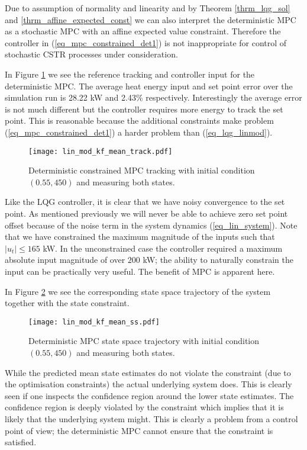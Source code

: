 Due to assumption of normality and linearity and by Theorem \ref{thrm_lqg_sol} and \ref{thrm_affine_expected_const} we can also interpret the deterministic MPC as a stochastic MPC with an affine expected value constraint. Therefore the controller in (\ref{eq_mpc_constrained_det1}) is not inappropriate for control of stochastic CSTR processes under consideration.

In Figure \ref{fig_lin_mod_kf_mean_track} we see the reference tracking and controller input for the deterministic MPC. The average heat energy input and set point error over the simulation run is 28.22 kW and 2.43\% respectively. Interestingly the average error is not much different but the controller requires more energy to track the set point. This is reasonable because the additional constraints make problem (\ref{eq_mpc_constrained_det1}) a harder problem than (\ref{eq_lqg_linmod}).
\begin{figure}[H] 
\centering
\texttt{[image: lin\_mod\_kf\_mean\_track.pdf]}
\caption{Deterministic constrained MPC tracking with initial condition $(0.55, 450)$ and measuring both states.}
\label{fig_lin_mod_kf_mean_track}
\end{figure}
Like the LQG controller, it is clear that we have noisy convergence to the set point. As mentioned previously we will never be able to achieve zero set point offset because of the noise term in the system dynamics (\ref{eq_lin_system}). Note that we have constrained the maximum magnitude of the inputs such that $|u_t| \leq 165$ kW. In the unconstrained case the controller required a maximum absolute input magnitude of over $200$ kW; the ability to naturally constrain the input can be practically very useful. The benefit of MPC is apparent here.

In Figure \ref{fig_lin_mod_kf_mean_ss} we see the corresponding state space trajectory of the system together with the state constraint.
\begin{figure}[H]
\centering
\texttt{[image: lin\_mod\_kf\_mean\_ss.pdf]}
\caption{Deterministic MPC state space trajectory with initial condition $(0.55, 450)$ and measuring both states.}
\label{fig_lin_mod_kf_mean_ss}
\end{figure}
While the predicted mean state estimates do not violate the constraint (due to the optimisation constraints) the actual underlying system does.  This is clearly seen if one inspects the confidence region around the lower state estimates. The confidence region is deeply violated by the constraint which implies that it is likely that the underlying system might. This is clearly a problem from a control point of view; the deterministic MPC cannot ensure that the constraint is satisfied.

